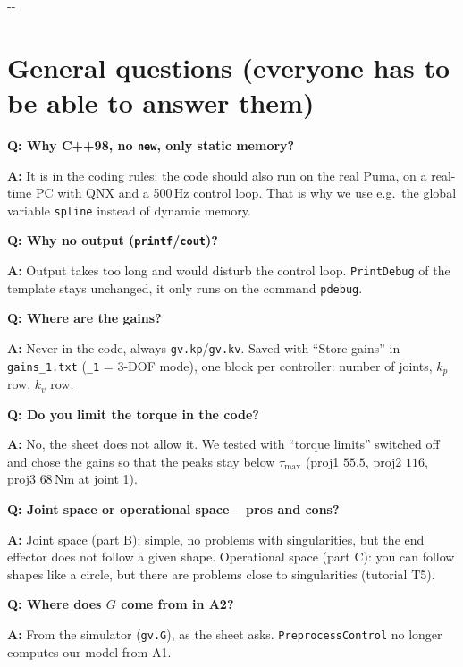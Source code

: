 \documentclass[10pt,a4paper]{article}
\makeatletter
\newcommand{\secneed}[1]{\par\penalty\@M\begingroup\setlength{\dimen@}{#1}\dimen@ii\pagegoal
  \advance\dimen@ii-\pagetotal\ifdim\dimen@>\dimen@ii\ifdim\dimen@ii>\z@\vfil\fi\penalty-\@M\fi\endgroup}
\let\oldsection\section
\renewcommand{\section}{\secneed{9\baselineskip}\oldsection}
\newcommand{\frage}[2]{\textbf{Q: #1}\par\nopagebreak\vspace{1pt}\textbf{A:} #2\par\vspace{5pt}}
\newcommand{\code}[1]{\texttt{#1}}
\makeatother
\begin{document}
\section{General questions (everyone has to be able to answer them)}

\begin{fragen}
\frage{Why C++98, no \code{new}, only static memory?}
{It is in the coding rules: the code should also run on the real Puma, on a real-time PC with QNX and a 500\,Hz control
loop. That is why we use e.g.\ the global variable \code{spline} instead of dynamic memory.}
\frage{Why no output (\code{printf}/\code{cout})?}
{Output takes too long and would disturb the control loop. \code{PrintDebug} of the template stays unchanged, it only
runs on the command \code{pdebug}.}
\frage{Where are the gains?}
{Never in the code, always \code{gv.kp}/\code{gv.kv}. Saved with ``Store gains'' in \code{gains\_1.txt} (\code{\_1} =
3-DOF mode), one block per controller: number of joints, $k_p$ row, $k_v$ row.}
\frage{Do you limit the torque in the code?}
{No, the sheet does not allow it. We tested with ``torque limits'' switched off and chose the gains so that the peaks stay
below $\tau_{\max}$ (proj1 $55.5$, proj2 $116$, proj3 $68$\,Nm at joint 1).}
\frage{Joint space or operational space -- pros and cons?}
{Joint space (part B): simple, no problems with singularities, but the end effector does not follow a given shape.
Operational space (part C): you can follow shapes like a circle, but there are problems close to singularities
(tutorial T5).}
\frage{Where does $G$ come from in A2?}
{From the simulator (\code{gv.G}), as the sheet asks. \code{PreprocessControl} no longer computes our model from A1.}
\end{fragen}
\end{document}
